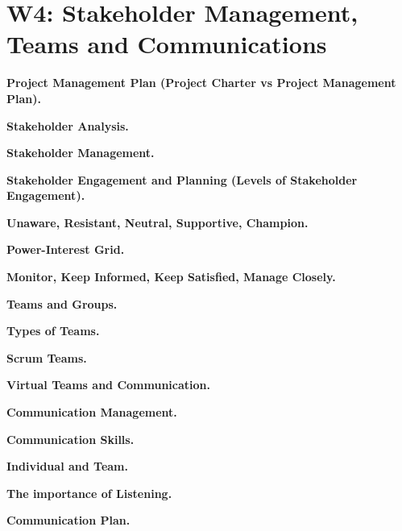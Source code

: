\section{W4: Stakeholder Management, Teams and Communications}

\textbf{Project Management Plan (Project Charter vs Project Management Plan).}

\textbf{Stakeholder Analysis.}

\textbf{Stakeholder Management.}

\textbf{Stakeholder Engagement and Planning (Levels of Stakeholder Engagement).}

    \textbf{Unaware, Resistant, Neutral, Supportive, Champion.}

\textbf{Power-Interest Grid.}

    \textbf{Monitor, Keep Informed, Keep Satisfied, Manage Closely.}

\textbf{Teams and Groups.}

\textbf{Types of Teams.}

\textbf{Scrum Teams.}

\textbf{Virtual Teams and Communication.}

\textbf{Communication Management.}

    \textbf{Communication Skills.}

    \textbf{Individual and Team.}

\textbf{The importance of Listening.}

\textbf{Communication Plan.}
